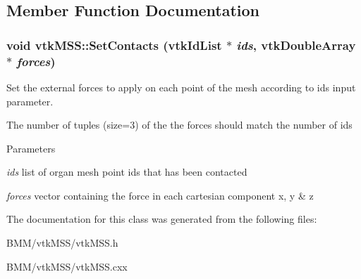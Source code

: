 \subsection{Member Function Documentation}
\hypertarget{classvtkMSS_ae0e9fb2f2ecb8c118a6e20a21212362e}{
\subsubsection[{SetContacts}]{\setlength{\rightskip}{0pt plus 5cm}void vtkMSS::SetContacts (vtkIdList $\ast$ {\em ids}, \/  vtkDoubleArray $\ast$ {\em forces})}}
\label{classvtkMSS_ae0e9fb2f2ecb8c118a6e20a21212362e}


Set the external forces to apply on each point of the mesh according to ids input parameter. 

The number of tuples (size=3) of the the forces should match the number of ids 
\begin{DoxyParams}{Parameters}
\item[{\em ids}]list of organ mesh point ids that has been contacted \item[{\em forces}]vector containing the force in each cartesian component x, y \& z \end{DoxyParams}


The documentation for this class was generated from the following files:\begin{DoxyCompactItemize}
\item 
BMM/vtkMSS/vtkMSS.h\item 
BMM/vtkMSS/vtkMSS.cxx\end{DoxyCompactItemize}
